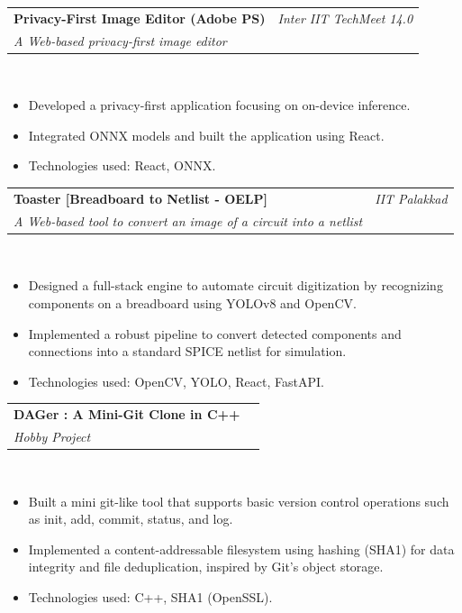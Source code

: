 \documentclass[a4paper,10pt]{article}
\makeatletter
\newcommand{\resumeSubheading}[4]{
\vspace{1.2mm}
    \begin{tabular*}{1.0\textwidth}[t]{l@{\extracolsep{\fill}}r}
        \textbf{#1} & \textit{\small{#4}} \\
        \textit{\small{#3}} &  \small{#2}\\
    \end{tabular*}\\[-1.5mm]
}
\newcommand{\resumeItemListStart}{\vspace{-1mm}\begin{justify}\begin{itemize}[leftmargin=3ex, rightmargin=2ex, noitemsep,labelsep=1.2mm,itemsep=0.4mm]\small}
\newcommand{\resumeItemListEnd}{\end{itemize}\end{justify}\vspace{-1.2mm}}
\makeatother
\begin{document}
\resumeSubheading
    {Privacy-First Image Editor (Adobe PS)}{}
    {A Web-based privacy-first image editor}{Inter IIT TechMeet 14.0}
\resumeItemListStart
  \item Developed a privacy-first application focusing on on-device inference.
  \item Integrated ONNX models and built the application using React.
  \item Technologies used: React, ONNX.
\resumeItemListEnd
\resumeSubheading
    {Toaster [Breadboard to Netlist - OELP]}{}
    {A Web-based tool to convert an image of a circuit into a netlist}{IIT Palakkad}
\resumeItemListStart
  \item Designed a full-stack engine to automate circuit digitization by recognizing components on a breadboard using YOLOv8 and OpenCV.
  \item Implemented a robust pipeline to convert detected components and connections into a standard SPICE netlist for simulation.
  \item Technologies used: OpenCV, YOLO, React, FastAPI.
\resumeItemListEnd
\resumeSubheading
  {DAGer : A Mini-Git Clone in C++}{}
  {Hobby Project}{}
\resumeItemListStart
  \item Built a mini git-like tool that supports basic version control operations such as init, add, commit, status, and log.
  \item Implemented a content-addressable filesystem using hashing (SHA1) for data integrity and file deduplication, inspired by Git's object storage.
  \item Technologies used: C++, SHA1 (OpenSSL).
\resumeItemListEnd

\end{document}
